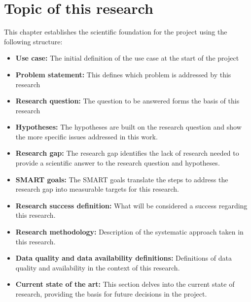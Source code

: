 
\chapter{Topic of this research}


This chapter establishes the scientific foundation for the project using the following structure:

\begin{itemize}
    \item \textbf{Use case: }The initial definition of the use case at the start of the project
    \item \textbf{Problem statement:} This defines which problem is addressed by this research
    \item \textbf{Research question: }The question to be answered forms the basis of this research
    \item \textbf{Hypotheses: }The hypotheses are built on the research question and show the more specific issues addressed in this work.
    \item \textbf{Research gap: }The research gap identifies the lack of research needed to provide a scientific answer to the research question and hypotheses.
    \item \textbf{SMART goals: }The SMART goals translate the steps to address the research gap into measurable targets for this research.
    \item \textbf{Research success definition: }What will be considered a success regarding this research.

    \item \textbf{Research methodology: }Description of the systematic approach taken in this research.
    \item \textbf{Data quality and data availability definitions: }Definitions of data quality and availability in the context of this research.
    \item \textbf{Current state of the art: }This section delves into the current state of research, providing the basis for future decisions in the project.
\end{itemize}












